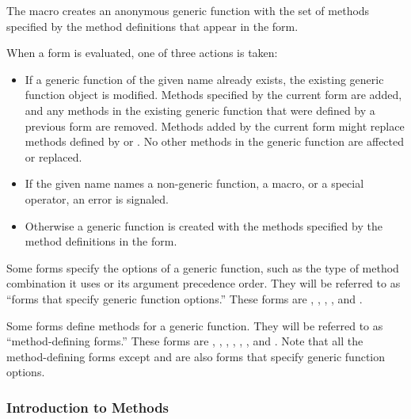The  macro creates an anonymous generic
function with the set of methods specified by the method definitions that appear
in the  form.

When a  form is evaluated, one of three actions
is taken:

\begin{itemize}

\item  If a generic function of the given name already exists,
the existing generic function object is modified.  Methods specified
by the current  form are added, and any methods in the
existing generic function that were defined by a previous 
 form are removed.  Methods added by the current 
 form might replace methods defined by  or
.  No other methods in the generic function are affected
or replaced.

\item  If the given name names a non-generic function, a
macro, or a special operator, an error is signaled.

\item  Otherwise a generic function is created with the
methods specified by the method definitions in the 
form.

\end{itemize}

Some forms specify the options of a generic function,
such as the type of method combination it uses or its argument
precedence order.  They will be referred to as ``forms that
specify generic function options.'' These forms are ,
, , , and
.

Some forms define methods for a generic function.  They will be
referred to as ``method-defining forms.'' These forms are 
, , , 
, , , and
. Note that all the method-defining forms except 
 and 
are also forms that specify generic function options.

\subsubsection{Introduction to Methods}
\label{Introduction-to-Methods-SECTION}

